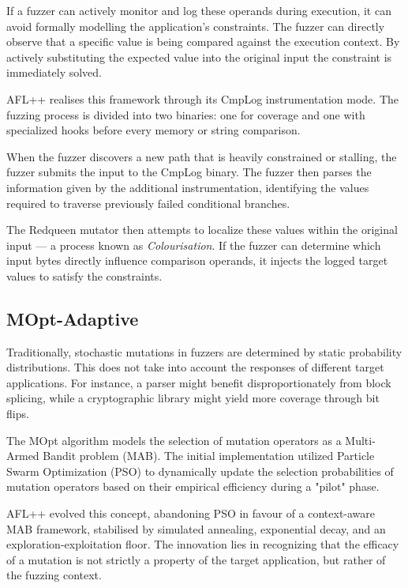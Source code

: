 If a fuzzer can actively monitor and log these operands during execution, it can avoid formally modelling the application's constraints. The fuzzer can directly observe that a specific value is being compared against the execution context. By actively substituting the expected value into the original input the constraint is immediately solved.

AFL++ realises this framework through its CmpLog instrumentation mode. The fuzzing process is divided into two binaries: one for coverage and one with specialized hooks before every memory or string comparison.

When the fuzzer discovers a new path that is heavily constrained or stalling, the fuzzer submits the input to the CmpLog binary. The fuzzer then parses the information given by the additional instrumentation, identifying the values required to traverse previously failed conditional branches.

The Redqueen mutator then attempts to localize these values within the original input --- a process known as \textit{Colourisation}. If the fuzzer can determine which input bytes directly influence comparison operands, it injects the logged target values to satisfy the constraints.

\subsection{MOpt-Adaptive}

Traditionally, stochastic mutations in fuzzers are determined by static probability distributions. This does not take into account the responses of different target applications. For instance, a parser might benefit disproportionately from block splicing, while a cryptographic library might yield more coverage through bit flips.

The MOpt algorithm \cite{lyu2019mopt} models the selection of mutation operators as a Multi-Armed Bandit problem (MAB). The initial implementation utilized Particle Swarm Optimization (PSO) to dynamically update the selection probabilities of mutation operators based on their empirical efficiency during a "pilot" phase.

AFL++ evolved this concept, abandoning PSO in favour of a context-aware MAB framework, stabilised by simulated annealing, exponential decay, and an exploration-exploitation floor. The innovation lies in recognizing that the efficacy of a mutation is not strictly a property of the target application, but rather of the fuzzing context. 


